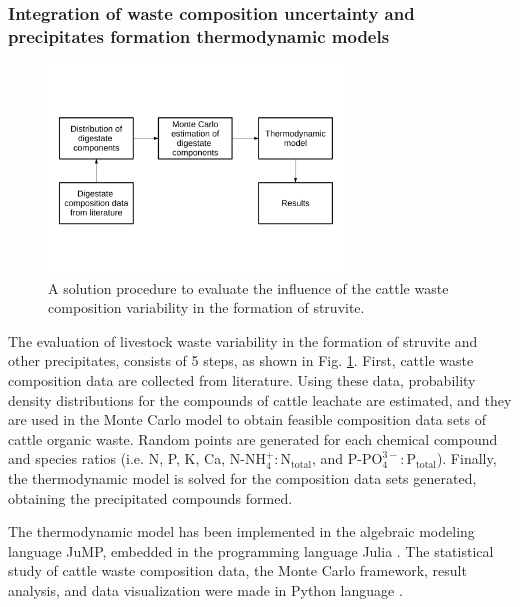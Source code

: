 \documentclass[10pt,a4paper]{article}
\begin{document}
\subsubsection{Integration of waste composition uncertainty and precipitates formation thermodynamic models}
\begin{figure}[]
	\begin{adjustwidth}{}{} 
		\centering
		\includegraphics[width=0.7\textwidth, trim=0 4.5cm 0 5cm, clip]{procedure} 
		\caption{A solution procedure to evaluate the influence of the cattle waste composition variability in the formation of struvite.} \label{fig:procedure_schema}
	\end{adjustwidth}{}
\end{figure}
The evaluation of livestock waste variability in the formation of struvite and other precipitates, consists of 5 steps, as shown in Fig. \ref{fig:procedure_schema}. First, cattle waste composition data are collected from literature. Using these data, probability density distributions for the compounds of cattle leachate are estimated, and they are used in the Monte Carlo model to obtain feasible composition data sets of cattle organic waste. Random points are generated for each chemical compound and species ratios (i.e. N, P, K, Ca, $\text{N-NH}_{4}^{+}:\text{N}_\text{total}$, and $\text{P-PO}_{4}^{3-}:\text{P}_{\text{total}}$). 
Finally, the thermodynamic model is solved for the composition data sets generated, obtaining the precipitated compounds formed.

The thermodynamic model has been implemented in the algebraic modeling language JuMP, embedded in the programming language Julia . The statistical study of cattle waste composition data, the Monte Carlo framework, result analysis, and data visualization were made in Python language .
\end{document}
